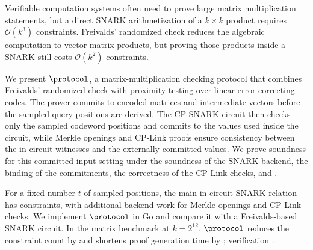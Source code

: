Verifiable computation systems often need to prove large matrix multiplication
statements, but a direct SNARK arithmetization of a \(k \times k\) product
requires \(\mathcal{O}(k^3)\) constraints. Freivalds' randomized check reduces
the algebraic computation to vector-matrix products, but proving those products
inside a SNARK still costs \(\mathcal{O}(k^2)\) constraints.

We present \(\protocol\), a matrix-multiplication checking protocol that combines
Freivalds' randomized check with proximity testing over linear error-correcting
codes. The prover commits to encoded matrices and intermediate vectors before
the sampled query positions are derived. The CP-SNARK circuit then checks only the sampled codeword positions and commits to the values used inside the circuit, while Merkle openings and CP-Link proofs ensure consistency between the in-circuit witnesses and the externally committed values. We prove soundness for this committed-input setting under the soundness of the SNARK backend, the binding of the commitments, the correctness of the CP-Link checks, and .

For a fixed number \(t\) of sampled positions, the main in-circuit SNARK
relation has  constraints, with additional
 backend work for Merkle openings
and CP-Link checks. We implement \(\protocol\) in Go and compare it with a
Freivalds-based SNARK circuit. In the matrix benchmark at \(k=2^{12}\),
\(\protocol\) reduces the constraint count by \revmath{9.68\times} and shortens proof
generation time by \revmath{5.81\times}; verification 
 .
